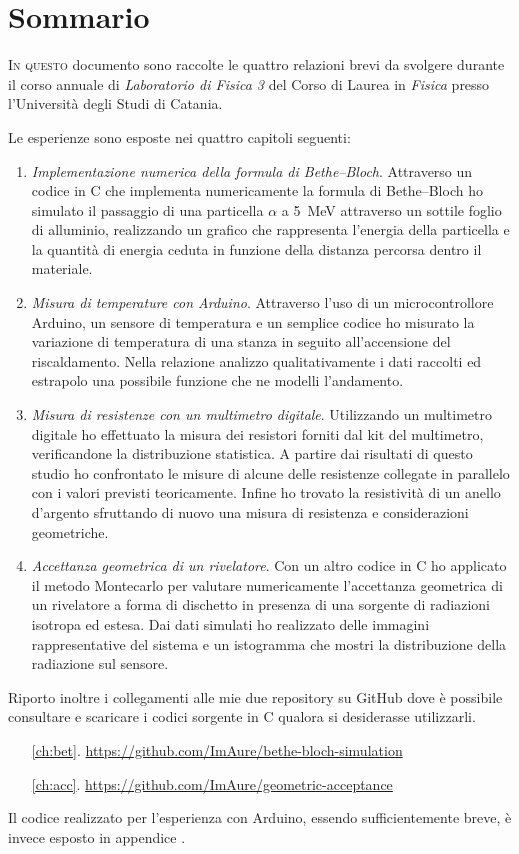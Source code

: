 \chapter{Sommario}
    \lettrine[loversize=0.08, lines=2]{I}{n questo} documento sono raccolte le quattro relazioni brevi da svolgere durante il corso annuale di \emph{Laboratorio di Fisica 3} del Corso di Laurea in \emph{Fisica} presso l'Università degli Studi di Catania.

    Le esperienze sono esposte nei quattro capitoli seguenti:
    \begin{enumerate}
        \item \emph{Implementazione numerica della formula di Bethe--Bloch}. Attraverso un codice in C che implementa numericamente la formula di Bethe--Bloch ho simulato il passaggio di una particella $\alpha$ a \SI{5}{\mega\eV} attraverso un sottile foglio di alluminio, realizzando un grafico che rappresenta l'energia della particella e la quantità di energia ceduta in funzione della distanza percorsa dentro il materiale.
        \item \emph{Misura di temperature con Arduino}. Attraverso l'uso di un microcontrollore Arduino, un sensore di temperatura e un semplice codice ho misurato la variazione di temperatura di una stanza in seguito all'accensione del riscaldamento. Nella relazione analizzo qualitativamente i dati raccolti ed estrapolo una possibile funzione che ne modelli l'andamento.
        \item \emph{Misura di resistenze con un multimetro digitale}. Utilizzando un multimetro digitale ho effettuato la misura dei resistori forniti dal kit del multimetro, verificandone la distribuzione statistica. A partire dai risultati di questo studio ho confrontato le misure di alcune delle resistenze collegate in parallelo con i valori previsti teoricamente. Infine ho trovato la resistività di un anello d'argento sfruttando di nuovo una misura di resistenza e considerazioni geometriche.
        \item \emph{Accettanza geometrica di un rivelatore}. Con un altro codice in C ho applicato il metodo Montecarlo per valutare numericamente l'accettanza geometrica di un rivelatore a forma di dischetto in presenza di una sorgente di radiazioni isotropa ed estesa. Dai dati simulati ho realizzato delle immagini rappresentative del sistema e un istogramma che mostri la distribuzione della radiazione sul sensore.
    \end{enumerate}
    
    Riporto inoltre i collegamenti alle mie due repository su GitHub dove è possibile consultare e scaricare i codici sorgente in C qualora si desiderasse utilizzarli.
    \begin{enumerate}
        \item[\ref{ch:bet}.] \url{https://github.com/ImAure/bethe-bloch-simulation}
        \item[\ref{ch:acc}.] \url{https://github.com/ImAure/geometric-acceptance}
    \end{enumerate}
    Il codice realizzato per l'esperienza con Arduino, essendo sufficientemente breve, è invece esposto in appendice .